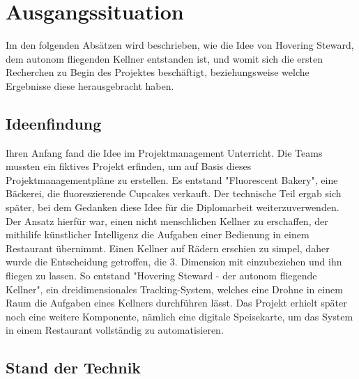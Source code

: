 \section{Ausgangssituation}
  Im den folgenden Absätzen wird beschrieben, wie die Idee von Hovering Steward, dem autonom fliegenden Kellner
  entstanden ist, und womit sich die ersten Recherchen zu Begin des Projektes beschäftigt, beziehungsweise
  welche Ergebnisse diese herausgebracht haben.

  \subsection{Ideenfindung}
  Ihren Anfang fand die Idee im Projektmanagement Unterricht. Die Teams mussten ein fiktives Projekt erfinden, um auf Basis dieses
  Projektmanagementpläne zu erstellen. Es entstand "Fluorescent Bakery", eine Bäckerei, die fluoreszierende Cupcakes verkauft.
  Der technische Teil ergab sich später, bei dem Gedanken diese Idee für die Diplomarbeit weiterzuverwenden. Der Ansatz hierfür war,
  einen nicht menschlichen Kellner zu erschaffen, der mithilife künstlicher Intelligenz die Aufgaben einer Bedienung in einem Restaurant übernimmt.
  Einen Kellner auf Rädern erschien zu simpel, daher wurde die Entscheidung getroffen, die 3. Dimension mit einzubeziehen und ihn fliegen zu lassen.
  So entstand "Hovering Steward - der autonom fliegende Kellner", ein dreidimensionales Tracking-System, welches eine Drohne in einem Raum die Aufgaben eines Kellners durchführen lässt.
  Das Projekt erhielt später noch eine weitere Komponente, nämlich eine digitale Speisekarte, um das System in einem Restaurant vollständig zu automatisieren.

  \subsection{Stand der Technik}
